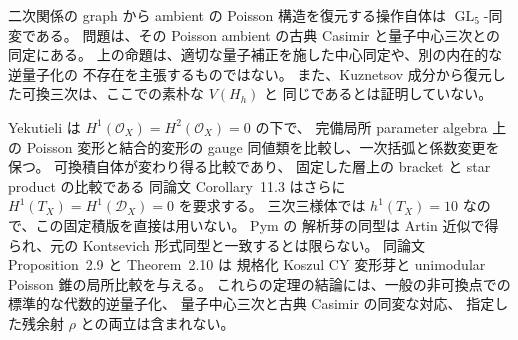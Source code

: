 \begin{remark}[この障害の範囲]
二次関係の graph から ambient の Poisson 構造を復元する操作自体は
$\operatorname{GL}_5$-同変である。
問題は、その Poisson ambient の古典 Casimir と量子中心三次との同定にある。
上の命題は、適切な量子補正を施した中心同定や、別の内在的な逆量子化の
不存在を主張するものではない。
また、Kuznetsov 成分から復元した可換三次は、ここでの素朴な $V(H_h)$ と
同じであるとは証明していない。
\end{remark}

\begin{remark}[形式量子化文献の適用範囲]
Yekutieli \cite[Corollary~11.2]{YekutieliTwisted} は
$H^1(\mathcal O_X)=H^2(\mathcal O_X)=0$ の下で、
完備局所 parameter algebra 上の Poisson 変形と結合的変形の
gauge 同値類を比較し、一次括弧と係数変更を保つ。
可換積自体が変わり得る比較であり、
固定した層上の bracket と star product の比較である
同論文 Corollary~11.3 はさらに $H^1(T_X)=H^1(\mathcal D_X)=0$ を要求する。
三次三様体では $h^1(T_X)=10$ なので、この固定積版を直接は用いない。
Pym \cite[Theorem~2.3 and the following paragraph]{Pym} の
解析芽の同型は Artin 近似で得られ、元の Kontsevich 形式同型と一致するとは限らない。
同論文 Proposition~2.9 と Theorem~2.10 は
規格化 Koszul CY 変形芽と unimodular Poisson 錐の局所比較を与える。
これらの定理の結論には、一般の非可換点での標準的な代数的逆量子化、
量子中心三次と古典 Casimir の同変な対応、
指定した残余射 $\rho$ との両立は含まれない。
\end{remark}
